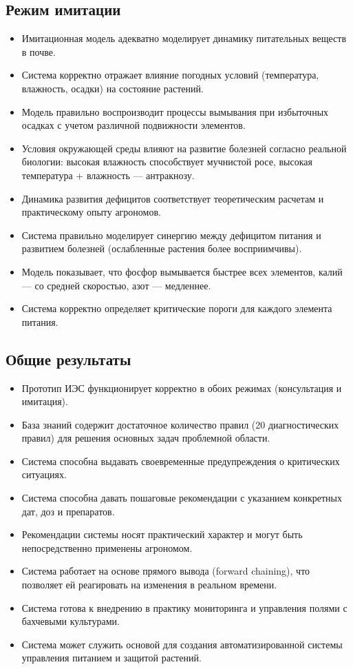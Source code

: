 \subsection{Режим имитации}
\begin{itemize}
    \item Имитационная модель адекватно моделирует динамику питательных веществ в почве.
    \item Система корректно отражает влияние погодных условий (температура, влажность, осадки) на состояние растений.
    \item Модель правильно воспроизводит процессы вымывания при избыточных осадках с учетом различной подвижности элементов.
    \item Условия окружающей среды влияют на развитие болезней согласно реальной биологии: высокая влажность способствует мучнистой росе, высокая температура + влажность --- антракнозу.
    \item Динамика развития дефицитов соответствует теоретическим расчетам и практическому опыту агрономов.
    \item Система правильно моделирует синергию между дефицитом питания и развитием болезней (ослабленные растения более восприимчивы).
    \item Модель показывает, что фосфор вымывается быстрее всех элементов, калий --- со средней скоростью, азот --- медленнее.
    \item Система корректно определяет критические пороги для каждого элемента питания.
\end{itemize}

\subsection{Общие результаты}
\begin{itemize}
    \item Прототип ИЭС функционирует корректно в обоих режимах (консультация и имитация).
    \item База знаний содержит достаточное количество правил (\num{20} диагностических правил) для решения основных задач проблемной области.
    \item Система способна выдавать своевременные предупреждения о критических ситуациях.
    \item Система способна давать пошаговые рекомендации с указанием конкретных дат, доз и препаратов.
    \item Рекомендации системы носят практический характер и могут быть непосредственно применены агрономом.
    \item Система работает на основе прямого вывода (forward chaining), что позволяет ей реагировать на изменения в реальном времени.
    \item Система готова к внедрению в практику мониторинга и управления полями с бахчевыми культурами.
    \item Система может служить основой для создания автоматизированной системы управления питанием и защитой растений.
\end{itemize}

